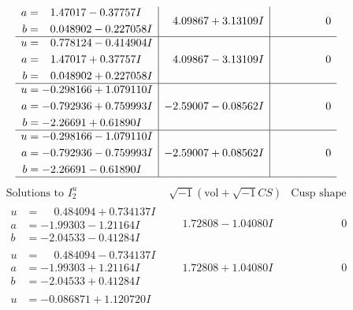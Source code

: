 \documentclass[1p]{elsarticle_modified}
\theoremstyle{definition}
\newcommand{\I}{\sqrt{-1}}
\begin{document}
$$\begin{array}{c|c|c}
\begin{aligned}
a &= \phantom{-}1.47017 - 0.37757 I \\
b &= \phantom{-}0.048902 - 0.227058 I\end{aligned}
 & \phantom{-}4.09867 + 3.13109 I & \phantom{-0.000000 } 0 \\ \hline\begin{aligned}
u &= \phantom{-}0.778124 - 0.414904 I \\
a &= \phantom{-}1.47017 + 0.37757 I \\
b &= \phantom{-}0.048902 + 0.227058 I\end{aligned}
 & \phantom{-}4.09867 - 3.13109 I & \phantom{-0.000000 } 0 \\ \hline\begin{aligned}
u &= -0.298166 + 1.079110 I \\
a &= -0.792936 + 0.759993 I \\
b &= -2.26691 + 0.61890 I\end{aligned}
 & -2.59007 - 0.08562 I & \phantom{-0.000000 } 0 \\ \hline\begin{aligned}
u &= -0.298166 - 1.079110 I \\
a &= -0.792936 - 0.759993 I \\
b &= -2.26691 - 0.61890 I\end{aligned}
 & -2.59007 + 0.08562 I & \phantom{-0.000000 } 0\\
 \hline 
 \end{array}$$\newpage$$\begin{array}{c|c|c}  
\text{Solutions to }I^u_{2}& \I (\text{vol} + \sqrt{-1}CS) & \text{Cusp shape}\\
 \hline 
\begin{aligned}
u &= \phantom{-}0.484094 + 0.734137 I \\
a &= -1.99303 - 1.21164 I \\
b &= -2.04533 - 0.41284 I\end{aligned}
 & \phantom{-}1.72808 - 1.04080 I & \phantom{-0.000000 } 0 \\ \hline\begin{aligned}
u &= \phantom{-}0.484094 - 0.734137 I \\
a &= -1.99303 + 1.21164 I \\
b &= -2.04533 + 0.41284 I\end{aligned}
 & \phantom{-}1.72808 + 1.04080 I & \phantom{-0.000000 } 0 \\ \hline\begin{aligned}
u &= -0.086871 + 1.120720 I \\

\end{aligned}
\end{array}$$
\end{document}

